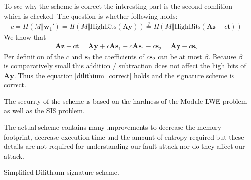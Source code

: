 To see why the scheme is correct the interesting part is the second condition which is checked. The question is whether following holds:
\begin{align}
\label{dilithium_correct}
	c = H(M \Vert \bm{w}_1') = H(M \Vert \text{HighBits}(\bm{A}\bm{y}))  \overset{?}{=}  H(M \Vert \text{HighBits}(\bm{A} \bm{z} - c \bm{t}))
\end{align}
We know that
\begin{align}
	\bm{A} \bm{z} - c \bm{t} = \bm{A}\bm{y}+c\bm{A}\bm{s}_1 - c\bm{A}\bm{s}_1 - c \bm{s}_2 = \bm{A}\bm{y}- c \bm{s}_2
\end{align}
Per definition of the $c$ and $\bm{s}_2$ the coefficients of  $c \bm{s}_2$ can be at most $β$. Because $β$ is comparatively small this addition / subtraction does not affect the high bits of  $\bm{A}\bm{y}$. Thus the equation \eqref{dilithium_correct} holds and the signature scheme is correct.

The security of the scheme is based on the hardness of the Module-LWE problem as well as the SIS problem.

The actual scheme contains many improvements to decrease the memory footprint, decrease execution time and the amount of entropy required but these details are not required for understanding our fault attack nor do they affect our attack.

\begin{algorithm}








\caption{Simplified Dilithium signature scheme.}
\label{alg:dilithium}
\end{algorithm}

